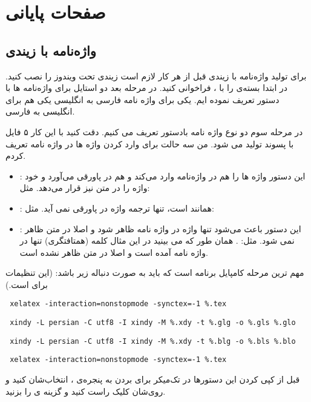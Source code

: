 \chapter{صفحات پایانی}
\section{واژه‌نامه با زیندی}
برای تولید واژه‌نامه با زیندی قبل از هر کار لازم است زیندی تحت ویندوز را نصب کنید.
در ابتدا بسته‌ی {} را با {}، {} فراخوانی کنید. در مرحله بعد دو استایل برای واژه‌نامه ها با دستور {} تعریف نموده ایم. یکی برای واژه نامه فارسی به انگلیسی یکی هم برای انگلیسی به فارسی. 

در مرحله سوم دو نوع واژه نامه بادستور {} تعریف می کنیم. دقت کنید با این کار ۵ فایل با پسوند {} تولید می شود. من سه حالت برای وارد کردن واژه ها در واژه نامه تعریف کردم.
\begin{itemize}
\item {}:
این دستور واژه ها را هم در واژه‌نامه وارد می‌کند و هم در پاورقی می‌آورد و خود واژه را در متن نیز قرار می‌دهد. مثل: {}

\item {}:
همانند {} است، تنها ترجمه واژه در پاورقی نمی آید. مثل: {}
\item {}:
این دستور باعث می‌شود تنها واژه در واژه نامه ظاهر شود و اصلا در متن ظاهر نمی شود. مثل: {}. همان طور که می بینید در این مثال کلمه (همتافتگری) تنها در واژه نامه آمده است و اصلا در متن ظاهر نشده است. 
\end{itemize}

مهم ترین مرحله کامپایل برنامه است که باید به صورت دنباله زیر باشد: (این تنظیمات برای {} است.)
\begin{itemize}
\begin{LTRitems}
\item
\verb+ xelatex -interaction=nonstopmode -synctex=-1 %.tex+
\item
\verb+ xindy -L persian -C utf8 -I xindy -M %.xdy -t %.glg -o %.gls %.glo +
\item
\verb+ xindy -L persian -C utf8 -I xindy -M %.xdy -t %.blg -o %.bls %.blo +
\item
\verb+ xelatex -interaction=nonstopmode -synctex=-1 %.tex+
\end{LTRitems}
\end{itemize}
قبل از کپی کردن این دستورها در تک‌میکر برای بردن به پنجره‌ی ، انتخاب‌شان کنید و روی‌شان کلیک راست کنید و گزینه ی  را بزنید. 

